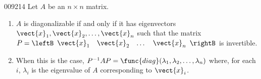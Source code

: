 \begin{theorem}{}{009214}
Let $A$ be an $n \times n$ matrix.


\begin{enumerate}
\item $A$ is diagonalizable if and only if it has eigenvectors $\vect{x}_{1}, \vect{x}_{2}, \dots , \vect{x}_{n}$ such that the matrix $P = \leftB \begin{array}{cccc} \vect{x}_{1}&  \vect{x}_{2} & \dots & \vect{x}_{n} \end{array}\rightB$ is invertible.

\item When this is the case, $P^{-1}AP = \func{diag}(\lambda_{1}, \lambda_{2}, \dots , \lambda_{n})$ where, for each $i$, $\lambda_{i}$ is the eigenvalue of $A$ corresponding to $\vect{x}_{i}$.

\end{enumerate}
\end{theorem}


